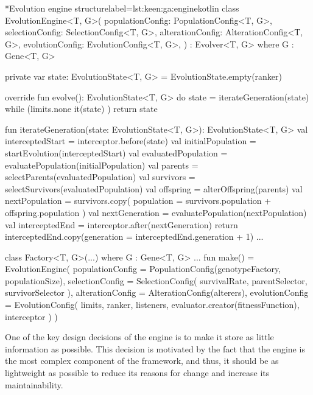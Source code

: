   \begin{code}*{Evolution engine structure}{label={lst:keen:ga:engine}}{kotlin}
    class EvolutionEngine<T, G>(
        populationConfig: PopulationConfig<T, G>,
        selectionConfig: SelectionConfig<T, G>,
        alterationConfig: AlterationConfig<T, G>,
        evolutionConfig: EvolutionConfig<T, G>,
    ) : Evolver<T, G> where G : Gene<T, G> {
    
        private var state: EvolutionState<T, G> = EvolutionState.empty(ranker)
    
        override fun evolve(): EvolutionState<T, G> {
            do {
                state = iterateGeneration(state)
            } while (limits.none { it(state) })
            return state
        }
    
        fun iterateGeneration(state: EvolutionState<T, G>): EvolutionState<T, G> {
            val interceptedStart = interceptor.before(state)
            val initialPopulation = startEvolution(interceptedStart)
            val evaluatedPopulation = evaluatePopulation(initialPopulation)
            val parents = selectParents(evaluatedPopulation)
            val survivors = selectSurvivors(evaluatedPopulation)
            val offspring = alterOffspring(parents)
            val nextPopulation = survivors.copy(
                population = survivors.population + offspring.population
            )
            val nextGeneration = evaluatePopulation(nextPopulation)
            val interceptedEnd = interceptor.after(nextGeneration)
            return interceptedEnd.copy(generation = interceptedEnd.generation + 1)
        }
        ...

        class Factory<T, G>(...) where G : Gene<T, G> {
            ...
            fun make() = EvolutionEngine(
                populationConfig = PopulationConfig(genotypeFactory, populationSize),
                selectionConfig = SelectionConfig(
                    survivalRate, parentSelector, survivorSelector
                ),
                alterationConfig = AlterationConfig(alterers),
                evolutionConfig = EvolutionConfig(
                    limits, ranker, listeners, evaluator.creator(fitnessFunction), interceptor
                )
            )
        }
    }
  
  \end{code}

  One of the key design decisions of the engine is to make it store as little
  information as possible.
  This decision is motivated by the fact that the engine is the most complex
  component of the framework, and thus, it should be as lightweight as possible
  to reduce its reasons for change and increase its maintainability.

